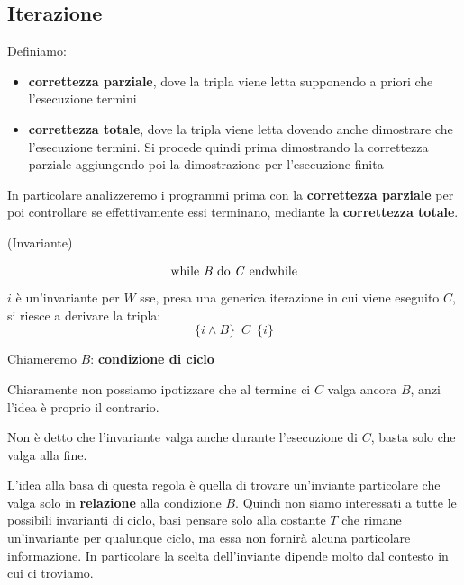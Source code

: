 			\subsection{Iterazione}
			\begin{definizione}
				Definiamo:
				\begin{itemize}
					\item \textbf{correttezza parziale}, dove la tripla viene letta supponendo a
					      priori che l'esecuzione termini
					\item \textbf{correttezza totale}, dove la tripla viene letta dovendo anche
					      dimostrare che l'esecuzione termini. Si procede quindi prima dimostrando la
					      correttezza parziale aggiungendo poi la dimostrazione per l'esecuzione
					      finita
				\end{itemize}
			\end{definizione} \vspace{5mm} %
			In particolare analizzeremo i programmi prima con la \textbf{correttezza parziale} per poi controllare se effettivamente essi terminano, mediante la \textbf{correttezza totale}.\\
			\begin{definizione}(Invariante)
			
			\[\mbox{ while \textit{B} do 
				\textit{C} endwhile }\]
				$i$ è un'invariante per $W$ sse, presa una generica iterazione in cui viene eseguito $C$, si riesce a derivare la tripla:
				\[\{i\land B\}\,\,\, C\,\,\,\{i\}\]
					\begin{corollario}
			Chiameremo $B$: \textbf{condizione di ciclo}
			\end{corollario}
			\begin{nota}
			Chiaramente non possiamo ipotizzare che al termine ci $C$ valga ancora $B$, anzi l'idea è proprio il contrario.
			\end{nota}
			\begin{nota}
			Non è detto che l'invariante valga anche durante l'esecuzione di $C$, basta solo che valga alla fine.
			\end{nota}
			\end{definizione}
				L'idea alla basa di questa regola è quella di trovare un'inviante particolare che valga solo in \textbf{relazione} alla condizione $B$. Quindi non siamo interessati a tutte le possibili invarianti di ciclo, basi pensare solo alla costante $T$ che rimane un'invariante per qualunque ciclo, ma essa non fornirà alcuna particolare informazione. In particolare la scelta dell'inviante dipende molto dal contesto in cui ci troviamo.
